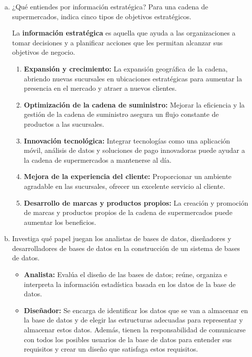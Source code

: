 \documentclass[12pt]{article}
\begin{document}
\begin{enumerate}[a.]
\item ¿Qué entiendes por información estratégica? Para una cadena de supermercados, indica cinco tipos de objetivos estratégicos.

La \textbf{información estratégica} es aquella que ayuda a las organizaciones a tomar decisiones y a planificar acciones que les permitan alcanzar sus objetivos de negocio.

\begin{enumerate}[1.]
    \item \textbf{Expansión y crecimiento:} La expansión geográfica de la cadena, abriendo nuevas sucursales en ubicaciones estratégicas para aumentar la presencia en el mercado y atraer a nuevos clientes.

    \item \textbf{ Optimización de la cadena de suministro:} Mejorar la eficiencia y la gestión de la cadena de suministro asegura un flujo constante de productos a las sucursales.

    \item \textbf{Innovación tecnológica:} Integrar tecnologías como una aplicación móvil, análisis de datos y soluciones de pago innovadoras puede ayudar a la cadena de supermercados a mantenerse al día.
    
    \item \textbf{Mejora de la experiencia del cliente:} Proporcionar un ambiente agradable en las sucursales, ofrecer un excelente servicio al cliente.

    \item \textbf{Desarrollo de marcas y productos propios:} La creación y promoción de marcas y productos propios de la cadena de supermercados puede aumentar los beneficios.
\end{enumerate}

\item Investiga qué papel juegan los analistas de bases de datos, diseñadores y desarrolladores de bases de datos en la construcción de un sistema de bases de datos.

\begin{itemize}
    \item \textbf{Analista: } Evalúa el diseño de las bases de datos; reúne, organiza e interpreta la información estadística basada en los datos de la base de datos.

    \item \textbf{Diseñador: } Se encarga de identificar los datos que se van a almacenar en la base de datos y de elegir las estructuras adecuadas para representar y almacenar estos datos. Además, tienen la responsabilidad de comunicarse con todos los posibles usuarios de la base de datos para entender sus requisitos y crear un diseño que satisfaga estos requisitos.


\end{itemize}
\end{enumerate}
\end{document}
